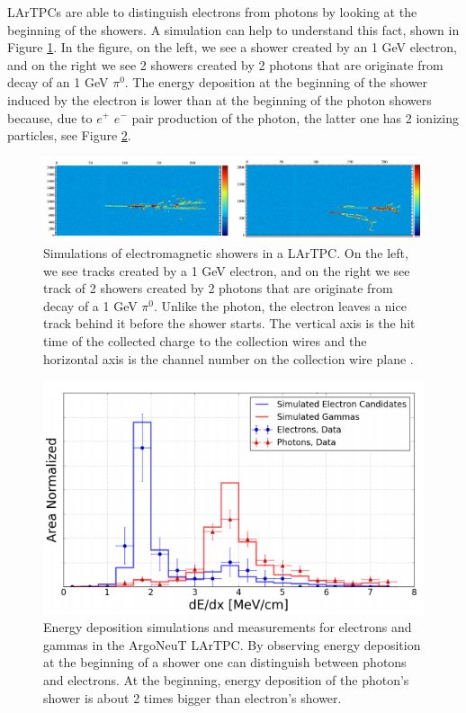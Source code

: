 \documentclass[a4paper]{article}\linespread{1.4}
\begin{document}
LArTPCs are able to distinguish electrons from photons by looking at the beginning of the showers. A simulation can help to understand this fact, shown in Figure \ref{fig:epi}. In the figure, on the left, we see a shower created by an 1 GeV electron, and on the right we see 2 showers created by 2 photons that are originate from decay of an 1 GeV $\pi^{0}$. 
The energy deposition at the beginning of the shower induced by the electron is lower than at the beginning of the photon showers because, due to $e^{+}$  $e^{-}$ pair production of the photon, the latter one has 2 ionizing particles, see Figure \ref{fig:mic}.
\begin{figure}[h!] \centering \includegraphics[width=124mm,scale=1.0]{figures/epi.png} \caption{Simulations of electromagnetic showers in a LArTPC. On the left, we see tracks created by a 1 GeV electron, and on the right we see track of 2 showers created by 2 photons that are originate from decay of a 1 GeV $\pi^{0}$. Unlike the photon, the electron leaves a nice track behind it before the shower starts. The vertical axis is the hit time of the collected charge to the collection wires and the horizontal axis is the channel number on the collection wire plane \cite{LK}.} \label{fig:epi} \end{figure}  
\begin{figure}[h!] \centering \includegraphics[width=124mm,scale=1.0]{figures/mic_neu.png} \caption{Energy deposition simulations and measurements for electrons and gammas in the ArgoNeuT LArTPC. By observing energy deposition at the beginning of a shower one can distinguish between photons and electrons. At the beginning, energy deposition of the photon's shower is about 2 times bigger than electron's shower. \cite{mic}} \label{fig:mic}\end{figure}  
\end{document}
